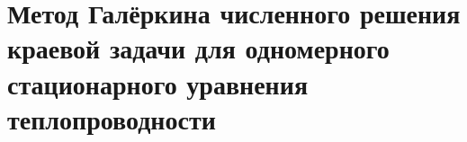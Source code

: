 \documentclass[__main__.tex]{subfiles}
\begin{document}
\section{Метод Галёркина численного решения краевой задачи для одномерного стационарного уравнения теплопроводности}
\end{document}
